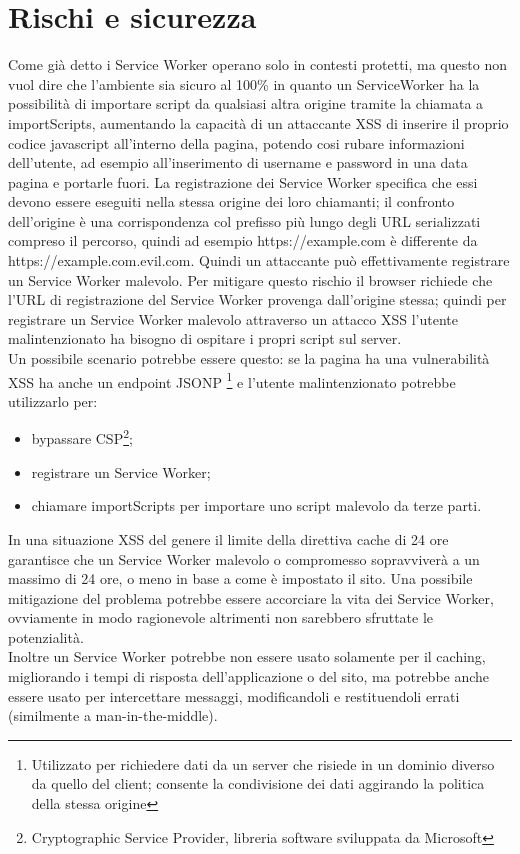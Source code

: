 \documentclass[11pt ,a4paper , twoside , openright ]{article}
\begin{document}
\section{Rischi e sicurezza}
Come già detto i Service Worker operano solo in contesti protetti, ma questo non vuol dire che l'ambiente sia sicuro al 100\% in quanto un ServiceWorker ha la possibilità di importare script da qualsiasi altra origine tramite la chiamata a importScripts, aumentando la capacità di un attaccante XSS di inserire il proprio codice javascript all'interno della pagina, potendo cosi rubare informazioni dell'utente, ad esempio all'inserimento di username e password in una data pagina e portarle fuori. La registrazione dei Service Worker specifica che essi devono essere eseguiti nella stessa origine dei loro chiamanti; il confronto dell'origine è una corrispondenza col prefisso più lungo degli URL serializzati compreso il percorso, quindi ad esempio https://example.com è differente da https://example.com.evil.com. Quindi un attaccante può effettivamente registrare un Service Worker malevolo. Per mitigare questo rischio il browser richiede che l'URL di registrazione del Service Worker provenga dall'origine stessa; quindi per registrare un Service Worker malevolo attraverso un attacco XSS l'utente malintenzionato ha bisogno di ospitare i propri script sul server.
\\
Un possibile scenario potrebbe essere questo: se la pagina ha una vulnerabilità XSS ha anche un endpoint JSONP \footnote{Utilizzato per richiedere dati da un server che risiede in un dominio diverso da quello del client; consente la condivisione dei dati aggirando la politica della stessa origine} e l'utente malintenzionato potrebbe utilizzarlo per:
\begin{itemize}
	\item bypassare CSP\footnote{Cryptographic Service Provider, libreria software sviluppata da Microsoft};
	\item registrare un Service Worker; 
	\item chiamare importScripts per importare uno script malevolo da terze parti.
\end{itemize}
In una situazione XSS del genere il limite della direttiva cache di 24 ore garantisce che un Service Worker malevolo o compromesso sopravviverà a un massimo di 24 ore, o meno in base a come è impostato il sito. Una possibile mitigazione del problema potrebbe essere accorciare la vita dei Service Worker, ovviamente in modo ragionevole altrimenti non sarebbero sfruttate le potenzialità.
\\
Inoltre un Service Worker potrebbe non essere usato solamente per il caching, migliorando i tempi di risposta dell'applicazione o del sito, ma potrebbe anche essere usato per intercettare messaggi, modificandoli e restituendoli errati (similmente a man-in-the-middle).
\end{document}
